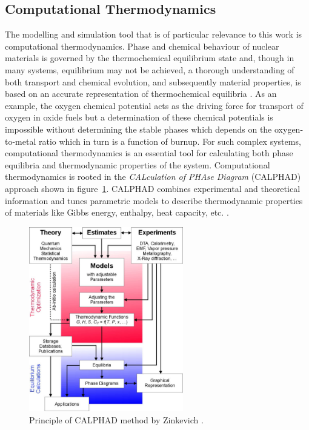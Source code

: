 \subsection{Computational Thermodynamics}
	The modelling and simulation tool that is of particular relevance to this work is computational thermodynamics. Phase and chemical behaviour of nuclear materials is governed by the thermochemical equilibrium state and, though in many systems, equilibrium may not be achieved, a thorough understanding of both transport and chemical evolution, and subsequently material properties, is based on an accurate representation of thermochemical equilibria \cite{Devanathan:2010aa}. As an example, the oxygen chemical potential acts as the driving force for transport of oxygen in oxide fuels but a determination of these chemical potentials is impossible without determining the stable phases which depends on the oxygen-to-metal ratio which in turn is a function of burnup.  For such complex systems, computational thermodynamics is an essential tool for calculating both phase equilibria and thermodynamic properties of the system. Computational thermodynamics is rooted in the \emph{CALculation of PHAse Diagram} (CALPHAD) approach shown in figure~\ref{fig:calphad}. CALPHAD combines
 experimental and theoretical information and tunes parametric models to describe thermodynamic properties of materials like Gibbs energy, enthalpy, heat capacity, etc. \cite{Lukas07}.
	\begin{figure}[htb]
		\centering
		\includegraphics[width=0.6\textwidth]{figures/chapter-1/Calphad_method}
		\caption[Principle of CALPHAD method]{Principle of CALPHAD method by Zinkevich \cite{Zinkevich:2003aa}.}
		\label{fig:calphad}
	\end{figure}

